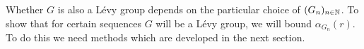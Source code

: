 Whether $G$ is also a L\'evy group depends on the particular choice of $(G_n)_{n\in\mathbb{N}}$. 
To show that for certain sequences $G$ will be a L\'evy group, we will bound $\alpha_{G_n}(r)$. To do this we need methods which are developed in the next section.

